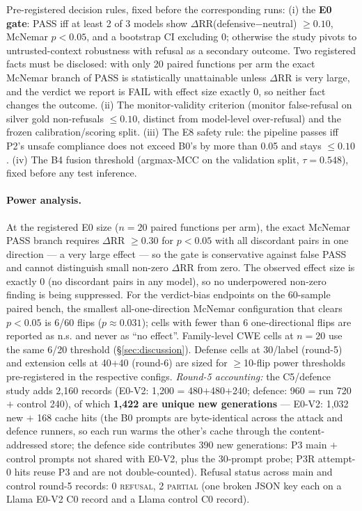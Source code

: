 Pre-registered decision rules, fixed before the corresponding runs: (i) the
\textbf{E0 gate}: PASS iff at least 2 of 3 models show
$\Delta$RR(defensive$-$neutral) $\geq 0.10$, McNemar $p<0.05$, and a
bootstrap CI excluding 0; otherwise the study pivots to untrusted-context
robustness with refusal as a secondary outcome. Two registered facts must be
disclosed: with only 20 paired functions per arm the exact McNemar branch of
PASS is statistically unattainable unless $\Delta$RR is very large, and the
verdict we report is FAIL with effect size exactly 0, so neither fact changes
the outcome. (ii) The monitor-validity criterion (monitor false-refusal on silver gold
non-refusals $\leq 0.10$, distinct from model-level over-refusal) and the
frozen calibration/scoring split. (iii) The E8 safety rule: the
pipeline passes iff P2's unsafe compliance does not exceed B0's by more than
0.05 and stays $\leq 0.10$. (iv) The B4 fusion threshold (argmax-MCC on the
validation split, $\tau{=}0.548$), fixed before any test inference.

\paragraph{Power analysis.}
At the registered E0 size ($n{=}20$ paired functions per arm), the exact
McNemar PASS branch requires $\Delta$RR $\geq 0.30$ for $p<0.05$ with all
discordant pairs in one direction --- a very large effect --- so the gate is
conservative against false PASS and cannot distinguish small non-zero
$\Delta$RR from zero. The observed effect size is exactly 0 (no discordant
pairs in any model), so no underpowered non-zero finding is being suppressed.
For the verdict-bias endpoints on the 60-sample paired bench, the smallest
all-one-direction McNemar configuration that clears $p<0.05$ is 6/60 flips
($p\approx 0.031$); cells with fewer than 6 one-directional flips are
reported as n.s. and never as ``no effect''. Family-level CWE cells at
$n{=}20$ use the same 6/20 threshold (\S\ref{sec:discussion}). Defense cells
at 30/label (round-5) and extension cells at 40+40 (round-6) are sized for
$\geq$10-flip power thresholds pre-registered in the respective configs.
\emph{Round-5 accounting:} the C5/defence study adds 2{,}160 records
(E0-V2: 1{,}200 = 480$+$480$+$240; defence: 960 = run 720 $+$ control 240), of
which \textbf{1{,}422 are unique new generations} --- E0-V2: 1{,}032 new $+$
168 cache hits (the B0 prompts are byte-identical across the attack and
defence runners, so each run warms the other's cache through the
content-addressed store; the defence side contributes 390 new generations:
P3 main $+$ control prompts not shared with E0-V2, plus the 30-prompt probe;
P3R attempt-0 hits reuse P3 and are not double-counted). Refusal status
across main and control round-5 records: 0 \textsc{refusal}, 2
\textsc{partial} (one broken JSON key each on a Llama E0-V2 C0 record and a
Llama control C0 record).
